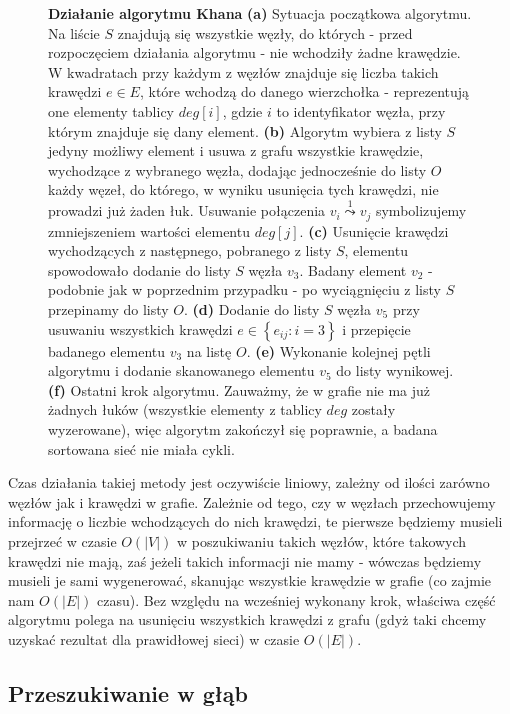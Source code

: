 \begin{figure}[!htbp]
\begin{subfigure}[b]{0.25\textwidth}
		\caption{}
	\end{subfigure}
	\caption{\textbf{Działanie algorytmu Khana} \textbf{(a)} Sytuacja początkowa algorytmu. Na liście $S$ znajdują się wszystkie węzły, do których - przed rozpoczęciem działania algorytmu - nie wchodziły żadne krawędzie. W kwadratach przy każdym z węzłów znajduje się liczba takich krawędzi $e \in E$, które wchodzą do danego wierzchołka - reprezentują one elementy tablicy $deg \left[ i \right]$, gdzie $i$ to identyfikator węzła, przy którym znajduje się dany element. \textbf{(b)} Algorytm wybiera z listy $S$ jedyny możliwy element i usuwa z grafu wszystkie krawędzie, wychodzące z wybranego węzła, dodając jednocześnie do listy $O$ każdy węzeł, do którego, w wyniku usunięcia tych krawędzi, nie prowadzi już żaden łuk. Usuwanie połączenia $v_{i} \overset{1} \leadsto v_{j}$ symbolizujemy zmniejszeniem wartości elementu $deg \left[ j \right]$. \textbf{(c)} Usunięcie krawędzi wychodzących z następnego, pobranego z listy $S$, elementu spowodowało dodanie do listy $S$ węzła $v_{3}$. Badany element $v_{2}$ - podobnie jak w poprzednim przypadku - po wyciągnięciu z listy $S$ przepinamy do listy $O$. \textbf{(d)} Dodanie do listy $S$ węzła $v_{5}$ przy usuwaniu wszystkich krawędzi $e \in \left\{ e_{ij} : i = 3 \right\}$ i przepięcie badanego elementu $v_{3}$ na listę $O$. \textbf{(e)} Wykonanie kolejnej pętli algorytmu i dodanie skanowanego elementu $v_{5}$ do listy wynikowej.  \textbf{(f)} Ostatni krok algorytmu. Zauważmy, że w grafie nie ma już żadnych łuków (wszystkie elementy z tablicy $deg$ zostały wyzerowane), więc algorytm zakończył się poprawnie, a badana sortowana sieć nie miała cykli.} \label{fig:exampleKhan}
\end{figure}

Czas działania takiej metody jest oczywiście liniowy, zależny od ilości zarówno węzłów jak i krawędzi w grafie. Zależnie od tego, czy w węzłach przechowujemy informację o liczbie wchodzących do nich krawędzi, te pierwsze będziemy musieli przejrzeć w czasie $O \left( \left| V \right| \right)$ w poszukiwaniu takich węzłów, które takowych krawędzi nie mają, zaś jeżeli takich informacji nie mamy - wówczas będziemy musieli je sami wygenerować, skanując wszystkie krawędzie w grafie (co zajmie nam $O \left( \left| E \right| \right)$ czasu). Bez względu na wcześniej wykonany krok, właściwa część algorytmu polega na usunięciu wszystkich krawędzi z grafu (gdyż taki chcemy uzyskać rezultat dla prawidłowej sieci) w czasie $O \left( \left| E \right| \right)$.

\subsection{Przeszukiwanie w głąb}

